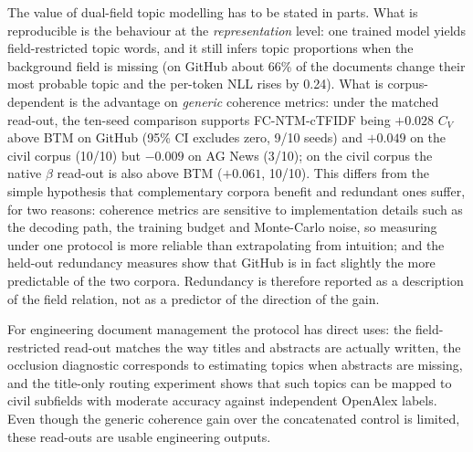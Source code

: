 \documentclass[Journal,letterpaper]{ascelike-new}
\newcommand{\fcntm}{FC-NTM}
\begin{document}
The value of dual-field topic modelling has to be stated in parts. What is reproducible is the
behaviour at the \emph{representation} level: one trained model yields field-restricted topic words,
and it still infers topic proportions when the background field is missing (on GitHub about 66\% of
the documents change their most probable topic and the per-token NLL rises by 0.24). What is
corpus-dependent is the advantage on \emph{generic} coherence metrics: under the matched read-out,
the ten-seed comparison supports \fcntm{}-cTFIDF being $+0.028$ $C_V$ above BTM on GitHub
(95\% CI excludes zero, 9/10 seeds) and $+0.049$ on the civil corpus (10/10) but $-0.009$ on
AG News (3/10); on the civil corpus the native $\beta$ read-out is also above BTM ($+0.061$,
10/10). This differs from the simple
hypothesis that complementary corpora benefit and redundant ones suffer, for two reasons: coherence
metrics are sensitive to implementation details such as the decoding path, the training budget and
Monte-Carlo noise, so measuring under one protocol is more reliable than extrapolating from
intuition; and the held-out redundancy measures show that GitHub is in fact slightly the more
predictable of the two corpora. Redundancy is therefore reported as a description of the field
relation, not as a predictor of the direction of the gain.

For engineering document management the protocol has direct uses: the field-restricted read-out
matches the way titles and abstracts are actually written, the occlusion diagnostic corresponds
to estimating topics when abstracts are missing, and the title-only routing experiment shows that
such topics can be mapped to civil subfields with moderate accuracy against independent OpenAlex
labels. Even though the generic coherence gain over the concatenated control is limited, these
read-outs are usable engineering outputs.
\end{document}
